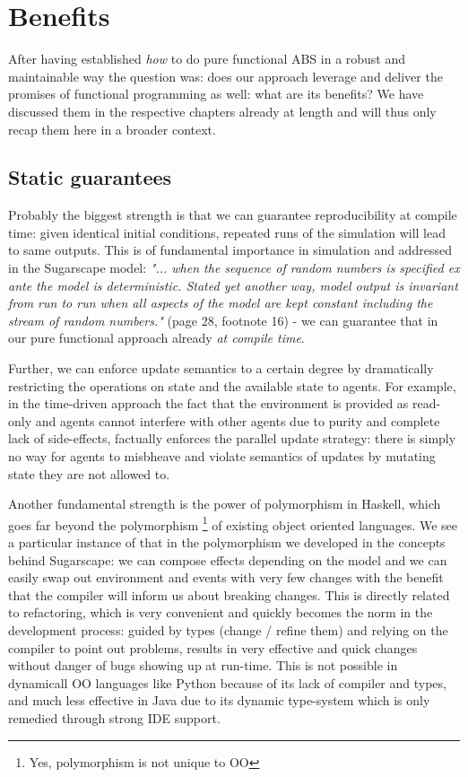 \section{Benefits}
After having established \textit{how} to do pure functional ABS in a robust and maintainable way the question was: does our approach leverage and deliver the promises of functional programming as well: what are its benefits? We have discussed them in the respective chapters already at length and will thus only recap them here in a broader context.

\subsection{Static guarantees}
Probably the biggest strength is that we can guarantee reproducibility at compile time: given identical initial conditions, repeated runs of the simulation will lead to same outputs. This is of fundamental importance in simulation and addressed in the Sugarscape model: \textit{"... when the sequence of random numbers is specified ex ante the model is deterministic. Stated yet another way, model output is invariant from run to run when all aspects of the model are kept constant including the stream of random numbers."} (page 28, footnote 16) - we can guarantee that in our pure functional approach already \textit{at compile time}.

Further, we can enforce update semantics to a certain degree by dramatically restricting the operations on state and the available state to agents. For example, in the time-driven approach the fact that the environment is provided as read-only and agents cannot interfere with other agents due to purity and complete lack of side-effects, factually enforces the parallel update strategy: there is simply no way for agents to misbheave and violate semantics of updates by mutating state they are not allowed to.

Another fundamental strength is the power of polymorphism in Haskell, which goes far beyond the polymorphism \footnote{Yes, polymorphism is not unique to OO} of existing object oriented languages. We see a particular instance of that in the polymorphism we developed in the concepts behind Sugarscape: we can compose effects depending on the model and we can easily swap out environment and events with very few changes with the benefit that the compiler will inform us about breaking changes. This is directly related to refactoring, which is very convenient and quickly becomes the norm in the development process: guided by types (change / refine them) and relying on the compiler to point out problems, results in very effective and quick changes without danger of bugs showing up at run-time. This is not possible in dynamicall OO languages like Python because of its lack of compiler and types, and much less effective in Java due to its dynamic type-system which is only remedied through strong IDE support.

